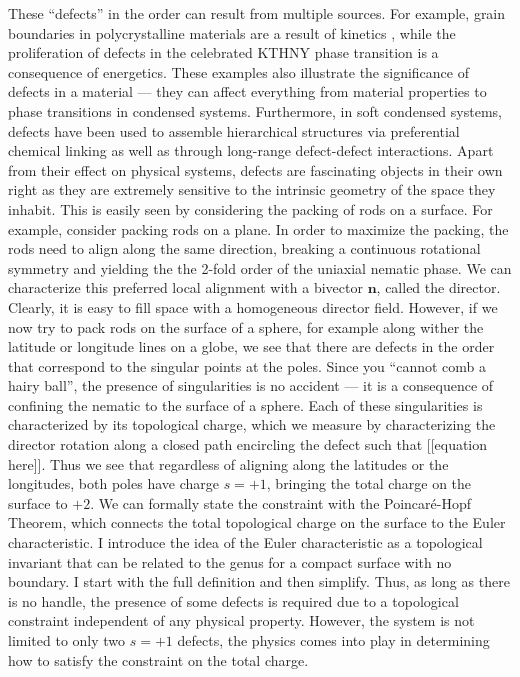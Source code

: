 These ``defects'' in the order can result from multiple sources.
For example, grain boundaries in polycrystalline materials are a result of kinetics , while the proliferation of defects in the celebrated KTHNY phase transition is a consequence of energetics.
These examples also illustrate the significance of defects in a material --- they can affect everything from material properties to phase transitions in condensed systems.
Furthermore, in soft condensed systems, defects have been used to assemble hierarchical structures via preferential chemical linking as well as through long-range defect-defect interactions.
Apart from their effect on physical systems, defects are fascinating objects in their own right as they are extremely sensitive to the intrinsic geometry of the space they inhabit.
This is easily seen by considering the packing of rods on a surface.
For example, consider packing rods on a plane.
In order to maximize the packing, the rods need to align along the same direction, breaking a continuous rotational symmetry and yielding the the 2-fold order of the uniaxial nematic phase.
We can characterize this preferred local alignment with a bivector $\mathbf{n}$, called the director.
Clearly, it is easy to fill space with a homogeneous director field.
However, if we now try to pack rods on the surface of a sphere, for example along wither the latitude or longitude lines on a globe, we see that there are defects in the order that correspond to the singular points at the poles.
Since you ``cannot comb a hairy ball'', the presence of singularities is no accident --- it is a consequence of confining the nematic to the surface of a sphere.
Each of these singularities is characterized by its topological charge, which we measure by characterizing the director rotation along a closed path encircling the defect such that [[equation here]].
Thus we see that regardless of aligning along the latitudes or the longitudes, both poles have charge $s = +1$, bringing the total charge on the surface to $+2$.
We can formally state the constraint with the Poincar\'e-Hopf Theorem, which connects the total topological charge on the surface to the Euler characteristic.
I introduce the idea of the Euler characteristic as a topological invariant that can be related to the genus for a compact surface with no boundary. I start with the full definition and then simplify.
Thus, as long as there is no handle, the presence of some defects is required due to a topological constraint independent of any physical property.
However, the system is not limited to only two $s=+1$ defects, the physics comes into play in determining how to satisfy the constraint on the total charge.
